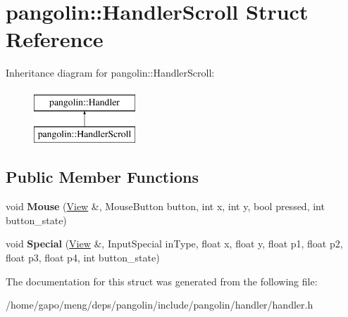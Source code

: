 \hypertarget{structpangolin_1_1_handler_scroll}{}\section{pangolin\+:\+:Handler\+Scroll Struct Reference}
\label{structpangolin_1_1_handler_scroll}
Inheritance diagram for pangolin\+:\+:Handler\+Scroll\+:\begin{figure}[H]
\begin{center}
\leavevmode
\includegraphics[height=2.000000cm]{structpangolin_1_1_handler_scroll}
\end{center}
\end{figure}
\subsection*{Public Member Functions}
\begin{DoxyCompactItemize}
\item 
void {\bfseries Mouse} (\hyperlink{structpangolin_1_1_view}{View} \&, Mouse\+Button button, int x, int y, bool pressed, int button\+\_\+state)\hypertarget{structpangolin_1_1_handler_scroll_a1242500103211997582034c4691d5ade}{}\label{structpangolin_1_1_handler_scroll_a1242500103211997582034c4691d5ade}

\item 
void {\bfseries Special} (\hyperlink{structpangolin_1_1_view}{View} \&, Input\+Special in\+Type, float x, float y, float p1, float p2, float p3, float p4, int button\+\_\+state)\hypertarget{structpangolin_1_1_handler_scroll_a5327bc5d9f896144f27b4bdf29c96e8e}{}\label{structpangolin_1_1_handler_scroll_a5327bc5d9f896144f27b4bdf29c96e8e}

\end{DoxyCompactItemize}


The documentation for this struct was generated from the following file\+:\begin{DoxyCompactItemize}
\item 
/home/gapo/meng/deps/pangolin/include/pangolin/handler/handler.\+h\end{DoxyCompactItemize}
